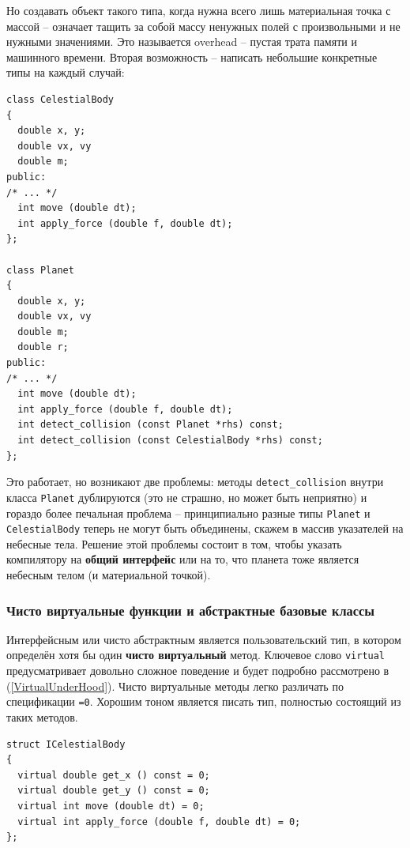 \documentclass[a4paper,12pt,oneside]{article}
\begin{document}
Но создавать объект такого типа, когда нужна всего лишь материальная точка с массой -- означает тащить за собой массу ненужных полей с произвольными и не нужными значениями. Это называется overhead -- пустая трата памяти и машинного времени. Вторая возможность -- написать небольшие конкретные типы на каждый случай:

\begin{lstlisting}
class CelestialBody
{
  double x, y;
  double vx, vy
  double m;
public:
/* ... */
  int move (double dt);
  int apply_force (double f, double dt);
};

class Planet
{
  double x, y;
  double vx, vy
  double m;
  double r;
public:
/* ... */
  int move (double dt);
  int apply_force (double f, double dt);
  int detect_collision (const Planet *rhs) const;
  int detect_collision (const CelestialBody *rhs) const;
};
\end{lstlisting}

Это работает, но возникают две проблемы: методы \lstinline!detect_collision! внутри класса \lstinline!Planet! дублируются (это не страшно, но может быть неприятно) и гораздо более печальная проблема -- принципиально разные типы \lstinline!Planet! и \lstinline!CelestialBody! теперь не могут быть объединены, скажем в массив указателей на небесные тела. Решение этой проблемы состоит в том, чтобы указать компилятору на \textbf{общий интерфейс} или на то, что планета тоже является небесным телом (и материальной точкой).

\subsubsection{Чисто виртуальные функции и абстрактные базовые классы}\label{PureVirtual}

Интерфейсным или чисто абстрактным является пользовательский тип, в котором определён хотя бы один \textbf{чисто виртуальный} метод. Ключевое слово \lstinline!virtual! предусматривает довольно сложное поведение и будет подробно рассмотрено в (\ref{VirtualUnderHood}). Чисто виртуальные методы легко различать по спецификации \lstinline!=0!. Хорошим тоном является писать тип, полностью состоящий из таких методов.

\begin{lstlisting}
struct ICelestialBody
{
  virtual double get_x () const = 0;
  virtual double get_y () const = 0;
  virtual int move (double dt) = 0;
  virtual int apply_force (double f, double dt) = 0;
};
\end{lstlisting}
\end{document}
